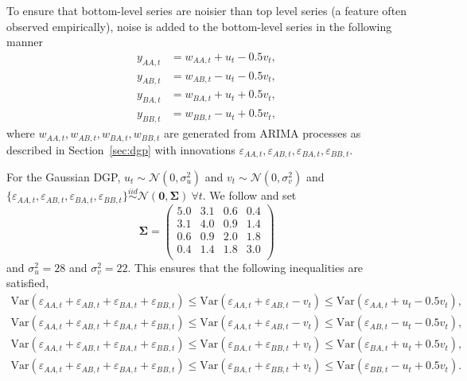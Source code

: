 \documentclass[11pt]{article}
\def\var{\text{Var}}
\theoremstyle{definition}
\begin{document}
To ensure that bottom-level series are noisier than top level series (a feature often observed empirically), noise is added to the bottom-level series in the following manner
\begin{align*}
y_{AA,t} &= w_{AA,t} + u_t - 0.5v_t,\\
y_{AB,t} &= w_{AB,t} - u_t - 0.5v_t,\\
y_{BA,t} &= w_{BA,t} + u_t + 0.5v_t,\\
y_{BB,t} &= w_{BB,t} - u_t + 0.5v_t,
\end{align*}
where $w_{AA,t},w_{AB,t},w_{BA,t},w_{BB,t}$ are generated from ARIMA processes as described in Section~\ref{sec:dgp} with innovations $\varepsilon_{AA,t},\varepsilon_{AB,t},\varepsilon_{BA,t},\varepsilon_{BB,t}$. %

For the Gaussian DGP, $u_t \sim \mathcal{N}(0,\sigma^2_u)$ and $v_t \sim \mathcal{N}(0,\sigma^2_v)$ and $\{\varepsilon_{AA,t},\varepsilon_{AB,t},\varepsilon_{BA,t},\varepsilon_{BB,t}\} \overset{iid}{\sim} \mathcal{N}(\bm{0}, \bm{\Sigma})~\forall t$. We follow \cite{WicEtAl2019} and set
\begin{equation*}\label{eq:SigmaGaussian}
\bm{\Sigma} =
\begin{pmatrix}
5.0 & 3.1 & 0.6 & 0.4 \\
3.1 & 4.0 & 0.9 & 1.4 \\
0.6 & 0.9 & 2.0 & 1.8 \\
0.4 & 1.4 & 1.8 & 3.0 \\
\end{pmatrix}
\end{equation*} and $\sigma^2_u=28$ and $\sigma^2_v=22$. This ensures that the following inequalities are satisfied,
\begin{align*}
\var(\varepsilon_{AA,t} + \varepsilon_{AB,t} + \varepsilon_{BA,t} + \varepsilon_{BB,t})
\le \var(\varepsilon_{AA,t}+\varepsilon_{AB,t}-v_t)
\le \var(\varepsilon_{AA,t}+u_t-0.5v_t),\\
\var(\varepsilon_{AA,t} + \varepsilon_{AB,t} + \varepsilon_{BA,t} + \varepsilon_{BB,t})
\le \var(\varepsilon_{AA,t}+\varepsilon_{AB,t}-v_t)
\le \var(\varepsilon_{AB,t}-u_t-0.5v_t),\\
\var(\varepsilon_{AA,t} + \varepsilon_{AB,t} + \varepsilon_{BA,t} + \varepsilon_{BB,t})
\le \var(\varepsilon_{BA,t}+\varepsilon_{BB,t}+v_t)
\le \var(\varepsilon_{BA,t}+u_t+0.5v_t),\\
\var(\varepsilon_{AA,t} + \varepsilon_{AB,t} + \varepsilon_{BA,t} + \varepsilon_{BB,t})
\le \var(\varepsilon_{BA,t}+\varepsilon_{BB,t}+v_t)
\le \var(\varepsilon_{BB,t}-u_t+0.5v_t).\\
\end{align*}
\end{document}
